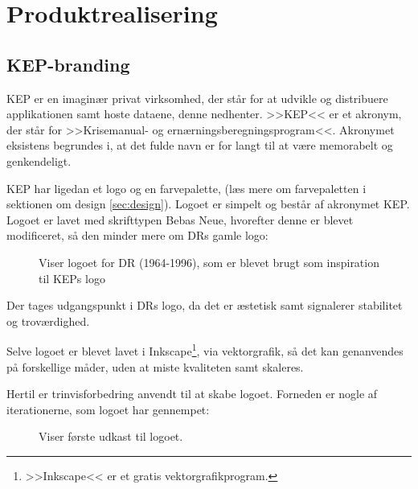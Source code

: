 \section{Produktrealisering \label{sec:produktrealisering}}

\subsection{KEP-branding \label{sec:kep-branding}}
KEP er en imaginær privat virksomhed, der står for at udvikle og distribuere applikationen samt hoste dataene, denne nedhenter. >>KEP<< er et akronym, der står for >>Krisemanual- og ernærningsberegningsprogram<<. Akronymet eksistens begrundes i, at det fulde navn er for langt til at være memorabelt og genkendeligt.

KEP har ligedan et logo og en farvepalette, (læs mere om farvepaletten i sektionen om design \ref{sec:design}). Logoet er simpelt og består af akronymet KEP. Logoet er lavet med skrifttypen Bebas Neue, hvorefter denne er blevet modificeret, så den minder mere om DRs gamle logo: 
\begin{figure}[H]
    \centering
    \caption{Viser logoet for DR (1964-1996), som er blevet brugt som inspiration til KEPs logo}
\end{figure}

Der tages udgangspunkt i DRs logo, da det er æstetisk samt signalerer stabilitet og troværdighed.

Selve logoet er blevet lavet i Inkscape\footnote{>>Inkscape<< er et gratis vektorgrafikprogram.}, via vektorgrafik, så det kan genanvendes på forskellige måder, uden at miste kvaliteten samt skaleres. 

Hertil er trinvisforbedring anvendt til at skabe logoet. Forneden er nogle af iterationerne, som logoet har gennempet:
\begin{figure}[H]
    \centering
    \caption{Viser første udkast til logoet.}
\end{figure}

